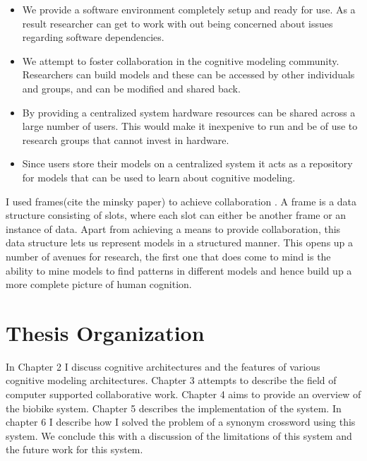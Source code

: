 \begin{itemize}
\item We provide a software environment completely setup and ready for
  use. As a result researcher can get to work with out being concerned
  about issues regarding software dependencies.
\item We attempt to foster collaboration in the cognitive modeling
  community. Researchers can build models and these can be accessed by
  other individuals and groups, and can be modified and shared back.
\item By providing a centralized system hardware resources can be
  shared across a large number of users. This would make it inexpenive
  to run and be of use to research groups that cannot invest in
  hardware.
\item Since users store their models on a centralized
  system it acts as a repository for models that can be used to
  learn about cognitive modeling.
\end{itemize}


I used frames(cite the minsky paper) to achieve collaboration
. A frame is a data structure consisting of slots, where each
slot can either be another frame or an instance of data. Apart from
achieving a means to provide collaboration, this data structure lets
us represent models in a structured manner. This opens up a number of
avenues for research, the first one that does come to mind is the
ability to mine models to find patterns in different models and
hence build up a more complete picture of human cognition.



\section{Thesis Organization}
In Chapter 2 I discuss cognitive architectures and the features of
various cognitive modeling 
architectures. Chapter 3 attempts to describe the field of computer supported
collaborative work. Chapter 4 aims to provide an overview of the
biobike system. Chapter 5 describes the implementation of the
system. In chapter 6 I describe how I solved the problem of a synonym
crossword using this system. We conclude this with a discussion of the
limitations of this system and the future work for this system.